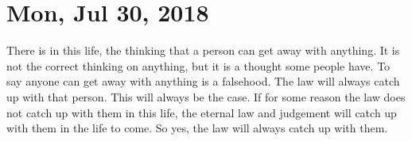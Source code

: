 \section{Mon, Jul 30, 2018}

There is in this life, the thinking that a person can get away with anything. It is
not the correct thinking on anything, but it is a thought some people have. To say
anyone can get away with anything is a falsehood. The law will always catch up with
that person. This will always be the case. If for some reason the law does not catch
up with them in this life, the eternal law and judgement will catch up with them in
the life to come. So yes, the law will always catch up with them.

